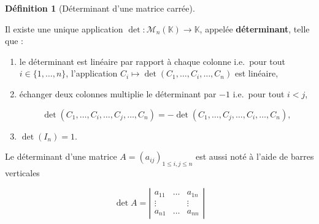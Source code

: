\documentclass[
  french,
  letterpaper,
  DIV=11,
  numbers=noendperiod]{scrreprt}
\theoremstyle{plain}
\theoremstyle{definition}
\newtheorem{definition}{Définition}[chapter]
\theoremstyle{plain}
\theoremstyle{plain}
\theoremstyle{definition}
\theoremstyle{definition}
\theoremstyle{plain}
\theoremstyle{remark}
\begin{document}
\begin{definition}[Déterminant d'une matrice
carrée]\protect\hypertarget{def-determinant}{}\label{def-determinant}

Il existe une unique application \(\det :\mathcal{M}_{n}(\mathbb{K}) \to
\mathbb{K}\), appelée \textbf{déterminant}, telle que :

\begin{enumerate}
\def\labelenumi{\arabic{enumi}.}
\item
  le déterminant est linéaire par rapport à chaque colonne i.e.~pour
  tout \(i
  \in \{1,\dots,n\}\), l'application \(C_{i} \mapsto
  \det(C_{1},\dots,C_i,\dots,C_{n})\) est linéaire,
\item
  échanger deux colonnes multiplie le déterminant par \(-1\) i.e.~pour
  tout \(i
  <j\),

  \[
   \det(C_{1},\dots,C_{i},\dots,C_{j},\dots,C_{n}) = - \det(C_{1},\dots,C_{j},\dots,C_{i},\dots,C_{n}),
  \]
\item
  \(\det(I_{n})=1\).
\end{enumerate}

Le déterminant d'une matrice
\(A = (a_{ij})_{1 \leqslant i,j \leqslant n}\) est aussi noté à l'aide
de barres verticales

\[
\det A = \left|\begin{matrix}
a_{11}& \dots & a_{1n}\\
\vdots&&\vdots\\
a_{n1}& \dots &a_{nn}
\end{matrix}\right|
\]

\end{definition}
\end{document}
